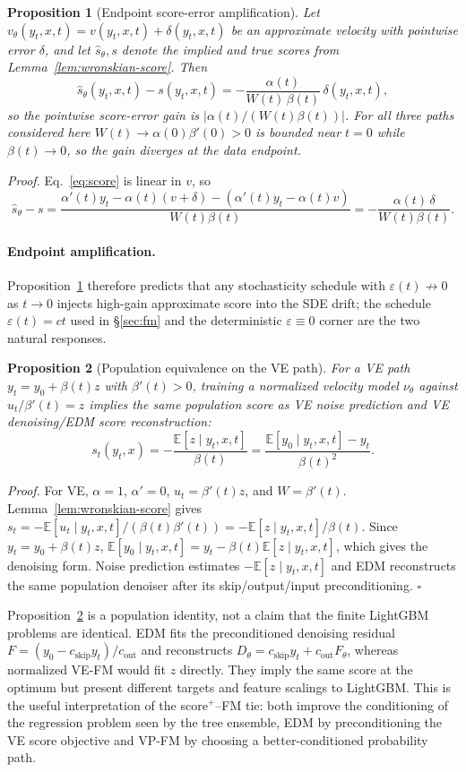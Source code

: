 \documentclass{uai2026}
\newcommand{\E}{\mathbb{E}}
\newtheorem{proposition}{Proposition}
\begin{document}
\begin{proposition}[Endpoint score-error amplification]\label{prop:endpoint-amp}
Let $v_\theta(y_t,x,t)=v(y_t,x,t)+\delta(y_t,x,t)$ be an approximate velocity with pointwise error $\delta$, and let $\hat s_\theta,s$ denote the implied and true scores from Lemma~\ref{lem:wronskian-score}. Then
\[
\hat s_\theta(y_t,x,t)-s(y_t,x,t)=-\frac{\alpha(t)}{W(t)\,\beta(t)}\,\delta(y_t,x,t),
\]
so the pointwise score-error gain is $|\alpha(t)/(W(t)\beta(t))|$. For all three paths considered here $W(t)\to\alpha(0)\beta'(0)>0$ is bounded near $t=0$ while $\beta(t)\to 0$, so the gain diverges at the data endpoint.
\end{proposition}
\emph{Proof.} Eq.~\eqref{eq:score} is linear in $v$, so
\[
\hat s_\theta - s
=\frac{\alpha'(t)y_t-\alpha(t)(v+\delta)-(\alpha'(t)y_t-\alpha(t)v)}{W(t)\beta(t)}
=-\frac{\alpha(t)\,\delta}{W(t)\beta(t)}. \tag*{$\square$}
\]

\paragraph{Endpoint amplification.} Proposition~\ref{prop:endpoint-amp} therefore predicts that any stochasticity schedule with $\varepsilon(t)\not\to 0$ as $t\to 0$ injects high-gain approximate score into the SDE drift; the schedule $\varepsilon(t)=ct$ used in \S\ref{sec:fm} and the deterministic $\varepsilon\equiv 0$ corner are the two natural responses.

\begin{proposition}[Population equivalence on the VE path]\label{prop:ve-equivalence}
For a VE path $y_t=y_0+\beta(t)z$ with $\beta'(t)>0$, training a normalized velocity model $\nu_\theta$ against $u_t/\beta'(t)=z$ implies the same population score as VE noise prediction and VE denoising/EDM score reconstruction:
\[
s_t(y_t,x)=-\frac{\E[z\mid y_t,x,t]}{\beta(t)}
          =\frac{\E[y_0\mid y_t,x,t]-y_t}{\beta(t)^2}.
\]
\end{proposition}
\emph{Proof.} For VE, $\alpha=1$, $\alpha'=0$, $u_t=\beta'(t)z$, and $W=\beta'(t)$. Lemma~\ref{lem:wronskian-score} gives $s_t=-\E[u_t\mid y_t,x,t]/(\beta(t)\beta'(t))=-\E[z\mid y_t,x,t]/\beta(t)$. Since $y_t=y_0+\beta(t)z$, $\E[y_0\mid y_t,x,t]=y_t-\beta(t)\E[z\mid y_t,x,t]$, which gives the denoising form. Noise prediction estimates $-\E[z\mid y_t,x,t]$ and EDM reconstructs the same population denoiser after its skip/output/input preconditioning. \hfill$\square$

Proposition~\ref{prop:ve-equivalence} is a population identity, not a claim that the finite LightGBM problems are identical. EDM fits the preconditioned denoising residual $F=(y_0-c_{\mathrm{skip}}y_t)/c_{\mathrm{out}}$ and reconstructs $D_\theta=c_{\mathrm{skip}}y_t+c_{\mathrm{out}}F_\theta$, whereas normalized VE-FM would fit $z$ directly. They imply the same score at the optimum but present different targets and feature scalings to LightGBM. This is the useful interpretation of the score$^+$--FM tie: both improve the conditioning of the regression problem seen by the tree ensemble, EDM by preconditioning the VE score objective and VP-FM by choosing a better-conditioned probability path.
\end{document}
